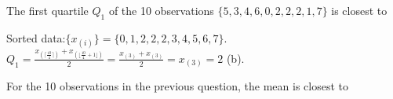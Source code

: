 \documentclass[bigtut]{tutorial}
\begin{document}
\begin{tutorial}
\begin{questions}
   
\question 
 The first quartile $Q_1$ of the 10 observations $\{ 5, 3, 4, 6, 0, 2, 2, 2, 1, 7 \}$ is closest to

\begin{solution}
Sorted data:$\{ x_{(i)} \} =  \{ 0,1,2,2,2,3,4,5,6,7 \}$. \\
$Q_{1} = \frac{ x_{(\lceil \frac{10}{4}  \rceil  )} + x_{( \lfloor\frac{10}{4} +1  \rfloor )} }{2} = \frac{ x_{(3)} + x_{(3)} }{2} = x_{(3)} = 2$ (b). \\
\end{solution}

\question
For the 10 observations in the previous question, the mean is closest to
\end{questions}
\end{tutorial}
\end{document}
